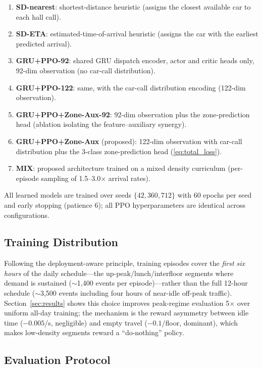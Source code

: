 \documentclass[conference]{IEEEtran}
\begin{document}
\begin{enumerate}
    \item \textbf{SD-nearest}: shortest-distance heuristic (assigns
    the closest available car to each hall call).
    \item \textbf{SD-ETA}: estimated-time-of-arrival heuristic
    (assigns the car with the earliest predicted arrival).
    \item \textbf{GRU+PPO-92}: shared GRU dispatch encoder, actor
    and critic heads only, 92-dim observation (no car-call
    distribution).
    \item \textbf{GRU+PPO-122}: same, with the car-call distribution
    encoding (122-dim observation).
    \item \textbf{GRU+PPO+Zone-Aux-92}: 92-dim observation plus the
    zone-prediction head (ablation isolating the feature--auxiliary
    synergy).
    \item \textbf{GRU+PPO+Zone-Aux} (proposed): 122-dim observation
    with car-call distribution plus the 3-class zone-prediction head
    (\eqref{eq:total_loss}).
    \item \textbf{MIX}: proposed architecture trained on a mixed
    density curriculum (per-episode sampling of 1.5--3.0$\times$
    arrival rates).
\end{enumerate}

All learned models are trained over seeds $\{42, 360, 712\}$ with 60
epochs per seed and early stopping (patience 6); all PPO
hyperparameters are identical across configurations.

\subsection{Training Distribution}

Following the deployment-aware principle, training episodes cover
the \emph{first six hours} of the daily schedule---the
up-peak/lunch/interfloor segments where demand is sustained
($\sim$1{,}400 events per episode)---rather than the full 12-hour
schedule ($\sim$3{,}500 events including four hours of near-idle
off-peak traffic). Section~\ref{sec:results} shows this choice
improves peak-regime evaluation 5$\times$ over uniform all-day
training; the mechanism is the reward asymmetry between idle time
($-0.005$/s, negligible) and empty travel ($-0.1$/floor,
dominant), which makes low-density segments reward a
``do-nothing'' policy.

\subsection{Evaluation Protocol}
\end{document}
